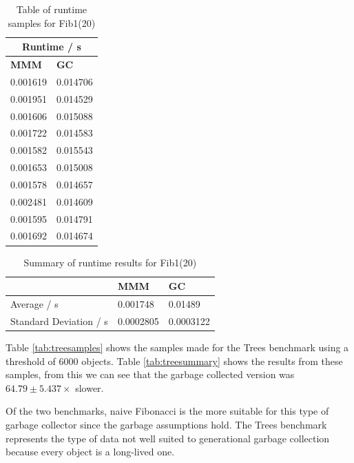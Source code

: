 \documentclass[../diss.tex]{subfiles}
\begin{document}
\begin{table}
    \centering
    \begin{tabular}{| l | l |}
        \hline
         \multicolumn{2}{|c|}{\bf{Runtime / s}} \\ \hline
         \bf{MMM} & \bf{GC} \\ \hline
         0.001619 & 0.014706 \\ \hline
         0.001951 & 0.014529 \\ \hline
         0.001606 & 0.015088 \\ \hline
         0.001722 & 0.014583 \\ \hline
         0.001582 & 0.015543 \\ \hline
         0.001653 & 0.015008 \\ \hline
         0.001578 & 0.014657 \\ \hline
         0.002481 & 0.014609 \\ \hline
         0.001595 & 0.014791 \\ \hline
         0.001692 & 0.014674 \\ \hline
    \end{tabular}
    \caption{Table of runtime samples for Fib1(20)}
    \label{tab:fibsamples}
\end{table}

\begin{table}
    \centering
    \begin{tabular}{| l | l | l |}
        \hline
         & \bf{MMM} & \bf{GC} \\ \hline
         Average / s & 0.001748 & 0.01489 \\ \hline
         Standard Deviation / s & 0.0002805 & 0.0003122 \\ \hline
        
    \end{tabular}
    \caption{Summary of runtime results for Fib1(20)}
    \label{tab:fibsummary}
\end{table}

Table \ref{tab:treesamples} shows the samples made for the Trees benchmark using a threshold of 6000 objects. Table \ref{tab:treesummary} shows the results from these samples, from this we can see that the garbage collected version was $64.79 \pm 5.437\times$ slower.

Of the two benchmarks, naive Fibonacci is the more suitable for this type of garbage collector since the garbage assumptions hold. The Trees benchmark represents the type of data not well suited to generational garbage collection because every object is a long-lived one. 
\end{document}
